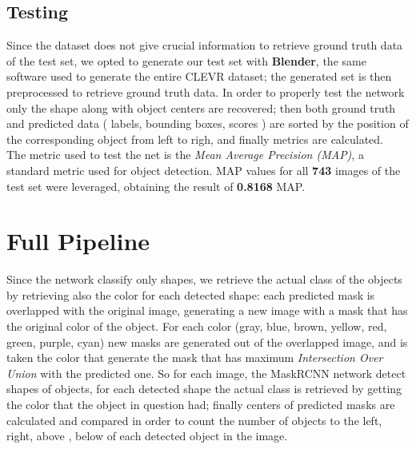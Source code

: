 \documentclass[10pt,twocolumn,letterpaper]{article}
\begin{document}
\subsection*{Testing}
  Since the dataset does not give crucial information to retrieve ground truth
  data of the test set, we opted to generate our test set with \textbf{Blender}, 
  the same software used to generate the entire CLEVR dataset; the generated set is then
  preprocessed to retrieve ground truth data. In order to properly test the network
  only the shape along with object centers are recovered; then both ground truth and 
  predicted data ( labels, bounding boxes, scores ) are sorted by the position of the
  corresponding object from left to righ, and finally metrics are calculated. 
  \\The metric used to test the net is the \textit{Mean Average Precision (MAP)}, a 
  standard metric used for object detection. MAP values for all
  \textbf{743} images of the test set
  were leveraged, obtaining the result of \textbf{0.8168} MAP.


\newpage
\section{Full Pipeline}
  Since the network classify only shapes, we retrieve the actual class of the objects by
  retrieving also the color for each detected shape:
  each predicted mask is overlapped with the original image,
  generating a new image with a mask that has the original color of the object.
  For each color (gray, blue, brown, yellow, red, green, purple, cyan)
   new masks are generated out of the overlapped image,
  and is taken the color that generate the mask that has maximum 
  \textit{Intersection Over Union} with the predicted one.
  \newline \newline So for each image, the MaskRCNN network detect shapes of objects,
  for each detected shape the actual class is retrieved by getting the color 
  that the object in question had; finally centers of predicted masks are calculated
  and compared in order to count the number of objects to the left, right, above , below 
  of each detected object in the image.
  
\end{document}
